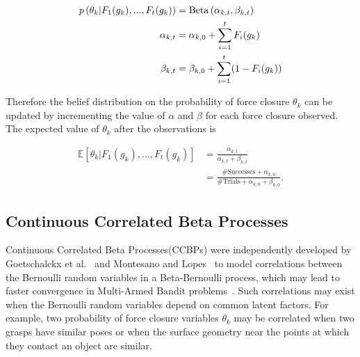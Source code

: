 \vspace{-2ex}
\begin{align*}
	p \left(\theta_k | F_{1}(g_k), ..., F_{t}(g_k) \right) &= \text{Beta}\left( \alpha_{k,t}, \beta_{k,t} \right) \\
	\alpha_{k,t} &= \alpha_{k,0} + \sum \limits_{i=1}^t F_{i}(g_k) \\
	\beta_{k,t} &= \beta_{k,0} + \sum \limits_{i=1}^t (1 - F_{i}(g_k))
\end{align*}

\noindent Therefore the belief distribution on the probability of force closure $\theta_k$ can be updated by incrementing the value of $\alpha$ and $\beta$ for each force closure observed.
The expected value of $\theta_k$ after the observations is

\begin{align*}
	\mathbb{E} \left[ \theta_k | F_{1}(g_k), ..., F_{t}(g_k) \right] &= \frac{\alpha_{k,t}}{\alpha_{k,t} + \beta_{k,t}} \\
	&= \frac{\mbox{\#Successes} +	
	\alpha_{k,0}}{\mbox{\#Trials}+\alpha_{k,0}+\beta_{k,0}}.
\end{align*}

\subsection{Continuous Correlated Beta Processes}

Continuous Correlated Beta Processes(CCBPs) were independently developed by Goetschalckx et al.~\cite{goetschalckx2011continuous} and Montesano and Lopes~\cite{montesano2012active} to model correlations between the Bernoulli random variables in a Beta-Bernoulli process, which may lead to faster convergence in Multi-Armed Bandit problems~\cite{chu2011contextual}.
Such correlations may exist when the Bernoulli random variables depend on common latent factors.
For example, two probability of force closure variables $\theta_k$ may be correlated when two grasps have similar poses or when the surface geometry near the points at which they contact an object are similar.

